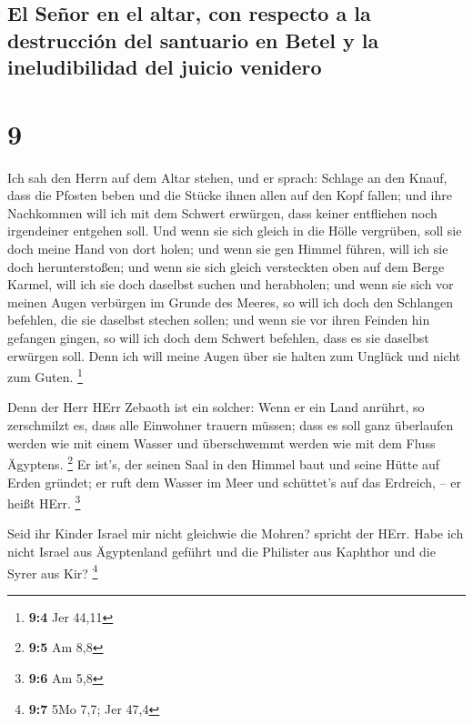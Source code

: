 \hypertarget{el-seuxf1or-en-el-altar-con-respecto-a-la-destrucciuxf3n-del-santuario-en-betel-y-la-ineludibilidad-del-juicio-venidero}{%
\subsection{El Señor en el altar, con respecto a la destrucción del
santuario en Betel y la ineludibilidad del juicio
venidero}\label{el-seuxf1or-en-el-altar-con-respecto-a-la-destrucciuxf3n-del-santuario-en-betel-y-la-ineludibilidad-del-juicio-venidero}}

\hypertarget{section-8}{%
\section{9}\label{section-8}}

 Ich sah den Herrn auf dem Altar stehen, und er sprach:
Schlage an den Knauf, dass die Pfosten beben und die Stücke ihnen allen
auf den Kopf fallen; und ihre Nachkommen will ich mit dem Schwert
erwürgen, dass keiner entfliehen noch irgendeiner entgehen soll.
 Und wenn sie sich gleich in die Hölle vergrüben, soll sie
doch meine Hand von dort holen; und wenn sie gen Himmel führen, will ich
sie doch herunterstoßen;  und wenn sie sich gleich
versteckten oben auf dem Berge Karmel, will ich sie doch daselbst suchen
und herabholen; und wenn sie sich vor meinen Augen verbürgen im Grunde
des Meeres, so will ich doch den Schlangen befehlen, die sie daselbst
stechen sollen;  und wenn sie vor ihren Feinden hin
gefangen gingen, so will ich doch dem Schwert befehlen, dass es sie
daselbst erwürgen soll. Denn ich will meine Augen über sie halten zum
Unglück und nicht zum Guten. \footnote{\textbf{9:4} Jer 44,11}

 Denn der Herr HErr Zebaoth ist ein solcher: Wenn er ein
Land anrührt, so zerschmilzt es, dass alle Einwohner trauern müssen;
dass es soll ganz überlaufen werden wie mit einem Wasser und
überschwemmt werden wie mit dem Fluss Ägyptens. \footnote{\textbf{9:5}
  Am 8,8}  Er ist's, der seinen Saal in den Himmel baut
und seine Hütte auf Erden gründet; er ruft dem Wasser im Meer und
schüttet's auf das Erdreich, -- er heißt HErr. \footnote{\textbf{9:6} Am
  5,8}

 Seid ihr Kinder Israel mir nicht gleichwie die Mohren?
spricht der HErr. Habe ich nicht Israel aus Ägyptenland geführt und die
Philister aus Kaphthor und die Syrer aus Kir? \footnote{\textbf{9:7} 5Mo
  7,7; Jer 47,4}

